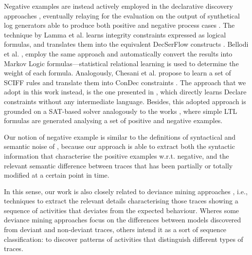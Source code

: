 Negative examples are instead actively employed in the declarative discovery approaches \cite{2007-Lamma,2009-Chesani,2010-Bellodi,2016-Bellodi}, %
eventually relaying for the evaluation on the output of synthetical log generators able to produce both positive and negative process cases \cite{2009-Goedertier,2014-Stocker,2010-Hee,2019-Chesani,2017-Chesani,2020-Loreti}.
The technique by Lamma et al. \cite{2007-Lamma,2007b-Lamma} learns integrity constraints expressed as logical formulas, and translates them into the equivalent DecSerFlow constructs \cite{2006-Aalst}. 
Bellodi et al. \cite{2010-Bellodi}, \cite{2016-Bellodi} employ the same approach and automatically convert the results into Markov Logic formulas---statistical relational learning is used to determine the weight of each formula.
Analogously, Chesani et al. \cite{2009-Chesani} propose to learn a set of SCIFF rules \cite{2008-Alberti} and translate them into ConDec constraints \cite{2006-Pesic}. The approach that we adopt in this work instead, is the one presented in \cite{deviant-tkde}, which directly learns Declare constraints without any intermediate language.
Besides, this adopted approach is grounded on a SAT-based solver analogously to the works \cite{2018-Neider,2019-Camacho,2019-Riener}, where simple \ac{LTL} formulas are generated analysing a set of positive and negative examples.

Our notion of negative example is similar to the definitions of syntactical and semantic noise of \cite{2009-Gunther}, because our approach is able to extract both the syntactic information that characterise the positive examples w.r.t. negative, and the relevant semantic difference between traces that has been partially or totally modified at a certain point in time.

In this sense, our work is also closely related to deviance mining approaches \cite{2016-Nguyen}, i.e., techniques to extract the relevant details characterising those traces showing a sequence of activities that deviates from the expected behaviour. Wheres some deviance mining approaches \cite{2014-Suriadi,2014-Armas} focus on the differences between models discovered from deviant and non-deviant traces, others \cite{2013-Suriadi,2015-Partington,2013-Bose,2007-Lo,2016-Bernardi} intend it as a sort of sequence classification: to discover patterns of activities that distinguish different types of traces.

